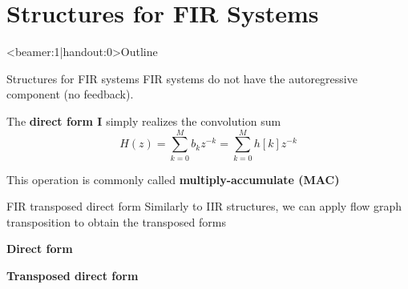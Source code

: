 \documentclass[10pt]{beamer}
\begin{document}
\section{Structures for FIR Systems}
\begin{frame}<beamer:1|handout:0>{Outline}
\tableofcontents[currentsection]
\end{frame}

\begin{frame}{Structures for FIR systems}
FIR systems do not have the autoregressive component (no feedback). 

The \textbf{direct form I} simply realizes the convolution sum
\begin{equation*}
H(z) = \sum_{k = 0}^Mb_kz^{-k} = \sum_{k = 0}^M h[k]z^{-k}
\end{equation*}

\begin{center}
	\resizebox{\textwidth}{!}{}
\end{center}

This operation is commonly called\textbf{ multiply-accumulate (MAC)}

\end{frame}

\begin{frame}{FIR transposed direct form}
Similarly to IIR structures, we can apply flow graph transposition to obtain the transposed forms

\textbf{Direct form}
\begin{center}
	\resizebox{0.9\textwidth}{!}{}
\end{center}

\textbf{Transposed direct form}
\begin{center}
	\resizebox{0.9\textwidth}{!}{}
\end{center}

\end{frame}
\end{document}

